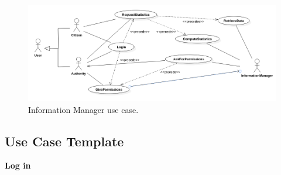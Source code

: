 \documentclass{report}
\begin{document}
\begin{figure}[ht!]
\begin{center}
\includegraphics[scale=0.35]{./img/UseCase3.png}
\end{center}
\caption{Information Manager use case.}
\label{schema}
\end{figure}
\newpage
\subsection{Use Case Template}
\begin{center}
	\textbf{Log in}
\end{center}
\end{document}
